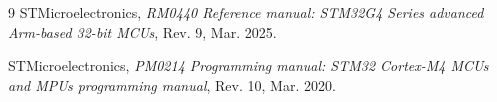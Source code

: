 \documentclass[12pt,a4paper]{article}
\begin{document}

\tableofcontents
\newpage



\begin{thebibliography}{9}
STMicroelectronics, \textit{RM0440 Reference manual: STM32G4 Series advanced Arm-based 32-bit MCUs}, Rev. 9, Mar. 2025.

STMicroelectronics, \textit{PM0214 Programming manual: STM32 Cortex-M4 MCUs and MPUs programming manual}, Rev. 10, Mar. 2020.
\end{thebibliography}
\end{document}
